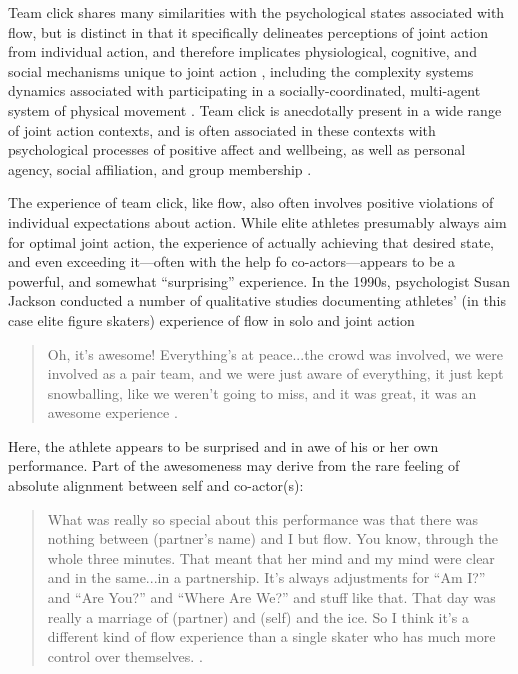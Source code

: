 \begin{CJK}{UTF8}{gbsn}
Team click shares many similarities with the psychological states associated with flow, but is distinct in that it specifically delineates perceptions of joint action from individual action, and therefore implicates physiological, cognitive, and social mechanisms unique to joint action \citep{Vesper2010}, including the complexity systems dynamics associated with participating in a socially-coordinated, multi-agent system of physical movement \citep{Kelso2009}.  Team click is anecdotally present in a wide range of joint action contexts, and is often associated in these contexts with psychological processes of positive affect and wellbeing, as well as personal agency, social affiliation, and group membership \citep{Jackson1995,Marsh2009,Wheatley2012,Slingerland2014}.


The experience of team click, like flow, also often involves positive violations of individual expectations about action.  While elite athletes presumably always aim for optimal joint action, the experience of actually achieving that desired state, and even exceeding it---often with the help fo co-actors---appears to be a powerful, and somewhat ``surprising'' experience.  In the 1990s, psychologist Susan Jackson conducted a number of qualitative studies documenting athletes' (in this case elite figure skaters) experience of flow in solo and joint action

    \begin{quote}
      Oh, it's awesome! Everything's at peace...the crowd was involved, we were involved as a pair team, and we were just aware of everything, it just kept snowballing, like we weren’t going to miss, and it was great, it was an awesome experience \citep[168]{Jackson1992}.
    \end{quote}

Here, the athlete appears to be surprised and in awe of his or her own performance.  Part of the awesomeness may derive from the rare feeling of absolute alignment between self and co-actor(s):

    \begin{quote}
      What was really so special about this performance was that there was nothing between (partner's name) and I but flow.  You know, through the whole three minutes.  That meant that her mind and my mind were clear and in the same...in a partnership. It's always adjustments for ``Am I?'' and ``Are You?'' and ``Where Are We?'' and stuff like that.  That day was really a marriage of (partner) and (self) and the ice.  So I think it's a different kind of flow experience than a single skater who has much more control over themselves. \citep[173-4]{Jackson1992}.
    \end{quote}


\end{CJK}
